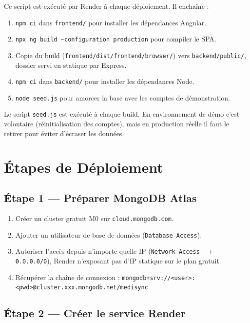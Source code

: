 \documentclass[12pt,a4paper]{report}
\begin{document}
Ce script est exécuté par Render à chaque déploiement. Il enchaîne :

\begin{enumerate}[leftmargin=*,itemsep=2pt]
  \item \texttt{npm ci} dans \texttt{frontend/} pour installer les dépendances Angular.
  \item \texttt{npx ng build --configuration production} pour compiler le SPA.
  \item Copie du build (\texttt{frontend/dist/frontend/browser/}) vers \texttt{backend/public/}, dossier servi en statique par Express.
  \item \texttt{npm ci} dans \texttt{backend/} pour installer les dépendances Node.
  \item \texttt{node seed.js} pour amorcer la base avec les comptes de démonstration.
\end{enumerate}

\begin{warnbox}[title=Seed en production]
  Le script \texttt{seed.js} est exécuté à chaque build. En environnement de démo c'est volontaire (réinitialisation des comptes), mais en production réelle il faut le retirer pour éviter d'écraser les données.
\end{warnbox}

\section{Étapes de Déploiement}

\subsection{Étape 1 — Préparer MongoDB Atlas}

\begin{enumerate}[leftmargin=*,itemsep=2pt]
  \item Créer un cluster gratuit M0 sur \texttt{cloud.mongodb.com}.
  \item Ajouter un utilisateur de base de données (\texttt{Database Access}).
  \item Autoriser l'accès depuis n'importe quelle IP (\texttt{Network Access $\rightarrow$ 0.0.0.0/0}), Render n'exposant pas d'IP statique sur le plan gratuit.
  \item Récupérer la chaîne de connexion : \texttt{mongodb+srv://<user>:<pwd>@cluster.xxx.mongodb.net/medisync}
\end{enumerate}

\subsection{Étape 2 — Créer le service Render}
\end{document}
